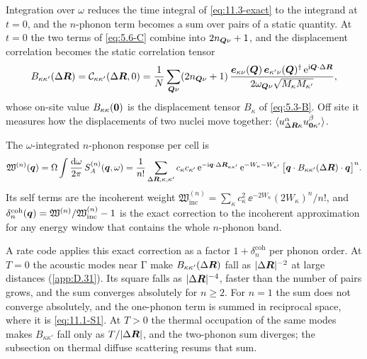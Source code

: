 Integration over $\omega$ reduces the time integral of \cref{eq:11.3-exact} to the integrand at $t = 0$, and the $n$-phonon term becomes a sum over pairs of a static quantity. At $t = 0$ the two terms of \cref{eq:5.6-C} combine into $2n_{\bm{Q}\nu} + 1$, and the displacement correlation becomes the static correlation tensor
\begin{equation}
  B_{\kappa\kappa'}(\Delta\bm{R}) = \mathcal{C}_{\kappa\kappa'}(\Delta\bm{R},0) = \frac1N\sum_{\bm{Q}\nu}(2n_{\bm{Q}\nu} + 1)\,\frac{\bm{e}_{\kappa\nu}(\bm{Q})\,\bm{e}_{\kappa'\nu}(\bm{Q})^\dagger\,\mathrm{e}^{\mathrm{i}\bm{Q}\cdot\Delta\bm{R}}}{2\omega_{\bm{Q}\nu}\sqrt{M_\kappa M_{\kappa'}}} ,
  \label{eq:11.3-Bkk}
\end{equation}
whose on-site value $B_{\kappa\kappa}(\bm{0})$ is the displacement tensor $B_\kappa$ of \cref{eq:5.3-B}. Off site it measures how the displacements of two nuclei move together: $\langle u^\alpha_{\Delta\bm{R}\kappa}u^\beta_{\bm{0}\kappa'}\rangle$.
\begin{keyresult}
The $\omega$-integrated $n$-phonon response per cell is
\begin{equation}
  \mathfrak{W}^{(n)}(\bm{q}) = \Omega\int\frac{\mathrm{d}\omega}{2\pi}\,S^{(n)}_A(\bm{q},\omega) = \frac{1}{n!}\sum_{\Delta\bm{R},\kappa,\kappa'}c_\kappa c_{\kappa'}\,\mathrm{e}^{-\mathrm{i}\bm{q}\cdot\Delta\bm{R}_{\kappa\kappa'}}\,\mathrm{e}^{-W_\kappa - W_{\kappa'}}\,\bigl[\bm{q}\cdot B_{\kappa\kappa'}(\Delta\bm{R})\cdot\bm{q}\bigr]^n .
  \label{eq:11.3-weight}
\end{equation}
Its self terms are the incoherent weight $\mathfrak{W}^{(n)}_{\mathrm{inc}} = \sum_\kappa c_\kappa^2\,\ee^{-2W_\kappa}(2W_\kappa)^n/n!$, and $\delta^{\mathrm{coh}}_n(\bm{q}) = \mathfrak{W}^{(n)}/\mathfrak{W}^{(n)}_{\mathrm{inc}} - 1$ is the exact correction to the incoherent approximation for any energy window that contains the whole $n$-phonon band.
\end{keyresult}
\noindent A rate code applies this exact correction as a factor $1 + \delta^{\mathrm{coh}}_n$ per phonon order. At $T = 0$ the acoustic modes near $\mathrm{\Gamma}$ make $B_{\kappa\kappa'}(\Delta\bm{R})$ fall as $|\Delta\bm{R}|^{-2}$ at large distances (\cref{app:D.31}). Its square falls as $|\Delta\bm{R}|^{-4}$, faster than the number of pairs grows, and the sum converges absolutely for $n \ge 2$. For $n = 1$ the sum does not converge absolutely, and the one-phonon term is summed in reciprocal space, where it is \cref{eq:11.1-S1}. At $T > 0$ the thermal occupation of the same modes makes $B_{\kappa\kappa'}$ fall only as $T/|\Delta\bm{R}|$, and the two-phonon sum diverges; the subsection on thermal diffuse scattering resums that sum.

